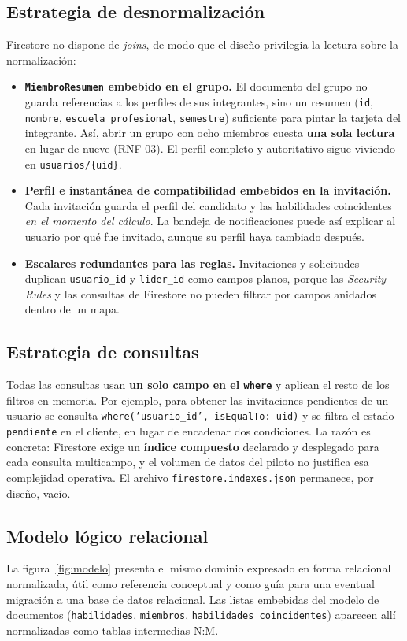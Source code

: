 \documentclass[12pt,a4paper]{article}
\begin{document}
\subsection{Estrategia de desnormalización}
Firestore no dispone de \emph{joins}, de modo que el diseño privilegia la lectura sobre la normalización:

\begin{itemize}
    \item \textbf{\texttt{MiembroResumen} embebido en el grupo.} El documento del grupo no guarda referencias a los perfiles de sus integrantes, sino un resumen (\texttt{id}, \texttt{nombre}, \texttt{escuela\_profesional}, \texttt{semestre}) suficiente para pintar la tarjeta del integrante. Así, abrir un grupo con ocho miembros cuesta \textbf{una sola lectura} en lugar de nueve (RNF-03). El perfil completo y autoritativo sigue viviendo en \texttt{usuarios/\{uid\}}.
    \item \textbf{Perfil e instantánea de compatibilidad embebidos en la invitación.} Cada invitación guarda el perfil del candidato y las habilidades coincidentes \emph{en el momento del cálculo}. La bandeja de notificaciones puede así explicar al usuario por qué fue invitado, aunque su perfil haya cambiado después.
    \item \textbf{Escalares redundantes para las reglas.} Invitaciones y solicitudes duplican \texttt{usuario\_id} y \texttt{lider\_id} como campos planos, porque las \emph{Security Rules} y las consultas de Firestore no pueden filtrar por campos anidados dentro de un mapa.
\end{itemize}

\subsection{Estrategia de consultas}
Todas las consultas usan \textbf{un solo campo en el \texttt{where}} y aplican el resto de los filtros en memoria. Por ejemplo, para obtener las invitaciones pendientes de un usuario se consulta \texttt{where('usuario\_id', isEqualTo: uid)} y se filtra el estado \texttt{pendiente} en el cliente, en lugar de encadenar dos condiciones. La razón es concreta: Firestore exige un \textbf{índice compuesto} declarado y desplegado para cada consulta multicampo, y el volumen de datos del piloto no justifica esa complejidad operativa. El archivo \texttt{firestore.indexes.json} permanece, por diseño, vacío.

\subsection{Modelo lógico relacional}
La figura~\ref{fig:modelo} presenta el mismo dominio expresado en forma relacional normalizada, útil como referencia conceptual y como guía para una eventual migración a una base de datos relacional. Las listas embebidas del modelo de documentos (\texttt{habilidades}, \texttt{miembros}, \texttt{habilidades\_coincidentes}) aparecen allí normalizadas como tablas intermedias N:M.
\end{document}
